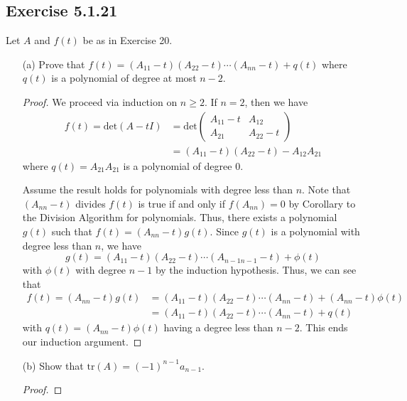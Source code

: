 \subsection*{Exercise 5.1.21} Let \( A  \) and \( f(t)  \) be as in Exercise 20.
\begin{enumerate} %
    \item[(a)] Prove that \( f(t) = ({A}_{11} - t)({A}_{22} - t) \cdots ({A}_{n n } - t) + q(t) \) where \( q(t) \) is a polynomial of degree at most \( n - 2  \). 
        \begin{proof}
        We proceed via induction on \( n \geq 2  \). If \( n = 2  \), then we have
        \begin{align*}
            f(t) = \text{det}(A - t I ) &= \text{det} \begin{pmatrix} 
                {A}_{11} - t & {A}_{12} \\
                {A}_{21} & {A}_{22} - t 
                      \end{pmatrix}  \\
                                        &= ({A}_{11} -t)({A}_{22} - t) - {A}_{12} {A}_{21}
        \end{align*}
        where \( q(t) = {A}_{21} {A}_{21} \) is a polynomial of degree \( 0  \).

        Assume the result holds for polynomials with degree less than \( n \). Note that \( ({A}_{n n  } - t ) \) divides \( f(t)  \) is true if and only if \( f({A}_{n n}) = 0  \) by Corollary to the Division Algorithm for polynomials. Thus, there exists a polynomial \( g(t)  \) such that \( f(t) = ({A}_{n n } - t)g(t) \).
Since \( g(t)  \) is a polynomial with degree less than \( n  \), we have
        \[  g(t) = ({A}_{11} - t)({A}_{22} - t) \cdots ({A}_{n-1 n-1} - t) + \phi(t) \]
        with \( \phi(t) \) with degree \( n -1  \) by the induction hypothesis. Thus, we can see that
        \begin{align*}
            f(t) = ({A}_{n n } - t)g(t)  
                 &= ({A}_{11} - t)({A}_{22} -t)\cdots({A}_{n n } -t) + ({A}_{n n } - t) \phi(t) \\
                 &=  ({A}_{11} - t)({A}_{22} -t)\cdots({A}_{n n } -t) + q(t) 
        \end{align*}
        with \( q(t) = ({A}_{n n } - t)\phi(t)  \) having a degree less than \( n -2  \). This ends our induction argument.
        \end{proof}
    \item[(b)] Show that \( \text{tr}(A) = (-1)^{n-1} {a}_{n-1} \).
        \begin{proof}
        
        \end{proof}
\end{enumerate}

